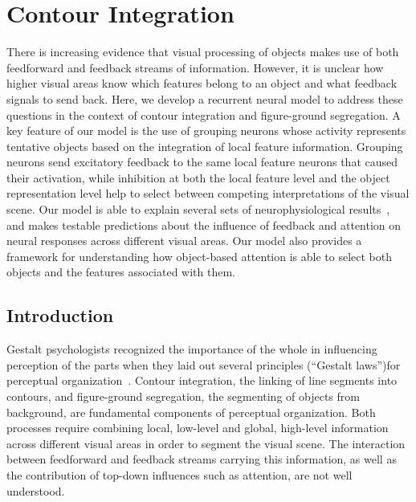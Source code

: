 \chapter{Contour Integration}
\label{sec:contour}

There is increasing evidence that visual processing of objects makes use of both feedforward and feedback streams of information. However, it is unclear how higher visual areas know which features belong to an object and what feedback signals to send back. Here, we develop a recurrent neural model to address these questions in the context of contour integration and figure-ground segregation. A key feature of our model is the use of grouping neurons whose activity represents tentative objects based on the integration of local feature information. Grouping neurons send excitatory feedback to the same local feature neurons that caused their activation, while inhibition
at both the local feature level and the object representation level help to select between competing interpretations of the visual scene.
Our model is able to explain several sets of neurophysiological results~\citep{Zhou_etal00,Qiu_etal07,Chen_etal14}, and makes
testable predictions about the influence of feedback and attention on
neural responses across different visual areas. Our model also provides a framework for understanding how object-based attention is able to select both objects and the features associated with them.

\section{Introduction}
\label{intro}
Gestalt psychologists recognized the importance of the whole in influencing perception of the parts when they laid out several principles (``Gestalt laws'')for perceptual organization~\citep{Wertheimer23,Koffka35}. Contour integration, the linking of line segments into contours, and figure-ground segregation, the segmenting of objects from background, are fundamental components of perceptual organization. Both processes require combining local, low-level and global, high-level information across different visual areas in order to segment the visual scene. The interaction between feedforward and feedback streams carrying this information, as well as the contribution of top-down influences such as attention, are not well understood.

